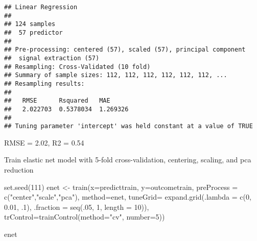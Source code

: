 \documentclass[
]{article}
\newenvironment{Shaded}{\begin{snugshade}}{\end{snugshade}}
\newcommand{\AttributeTok}[1]{\textcolor[rgb]{0.77,0.63,0.00}{#1}}
\newcommand{\DecValTok}[1]{\textcolor[rgb]{0.00,0.00,0.81}{#1}}
\newcommand{\FloatTok}[1]{\textcolor[rgb]{0.00,0.00,0.81}{#1}}
\newcommand{\FunctionTok}[1]{\textcolor[rgb]{0.00,0.00,0.00}{#1}}
\newcommand{\NormalTok}[1]{#1}
\newcommand{\OtherTok}[1]{\textcolor[rgb]{0.56,0.35,0.01}{#1}}
\newcommand{\StringTok}[1]{\textcolor[rgb]{0.31,0.60,0.02}{#1}}
\begin{document}
\begin{verbatim}
## Linear Regression 
## 
## 124 samples
##  57 predictor
## 
## Pre-processing: centered (57), scaled (57), principal component
##  signal extraction (57) 
## Resampling: Cross-Validated (10 fold) 
## Summary of sample sizes: 112, 112, 112, 112, 112, 112, ... 
## Resampling results:
## 
##   RMSE      Rsquared   MAE     
##   2.022703  0.5378034  1.269326
## 
## Tuning parameter 'intercept' was held constant at a value of TRUE
\end{verbatim}

RMSE = 2.02, R2 = 0.54

Train elastic net model with 5-fold cross-validation, centering,
scaling, and pca reduction

\begin{Shaded}
\begin{Highlighting}[]
\FunctionTok{set.seed}\NormalTok{(}\DecValTok{111}\NormalTok{)}
\NormalTok{enet }\OtherTok{\textless{}{-}} \FunctionTok{train}\NormalTok{(}\AttributeTok{x=}\NormalTok{predicttrain,}
             \AttributeTok{y=}\NormalTok{outcometrain,}
             \AttributeTok{preProcess =} \FunctionTok{c}\NormalTok{(}\StringTok{"center"}\NormalTok{,}\StringTok{"scale"}\NormalTok{,}\StringTok{"pca"}\NormalTok{),}
             \AttributeTok{method=}\StringTok{\textquotesingle{}enet\textquotesingle{}}\NormalTok{,}
             \AttributeTok{tuneGrid=} \FunctionTok{expand.grid}\NormalTok{(}\AttributeTok{.lambda =} \FunctionTok{c}\NormalTok{(}\DecValTok{0}\NormalTok{, }\FloatTok{0.01}\NormalTok{, .}\DecValTok{1}\NormalTok{), }\AttributeTok{.fraction =} \FunctionTok{seq}\NormalTok{(.}\DecValTok{05}\NormalTok{, }\DecValTok{1}\NormalTok{, }\AttributeTok{length =} \DecValTok{10}\NormalTok{)),}
             \AttributeTok{trControl=}\FunctionTok{trainControl}\NormalTok{(}\AttributeTok{method=}\StringTok{"cv"}\NormalTok{, }\AttributeTok{number=}\DecValTok{5}\NormalTok{))}

\NormalTok{enet}
\end{Highlighting}
\end{Shaded}
\end{document}
